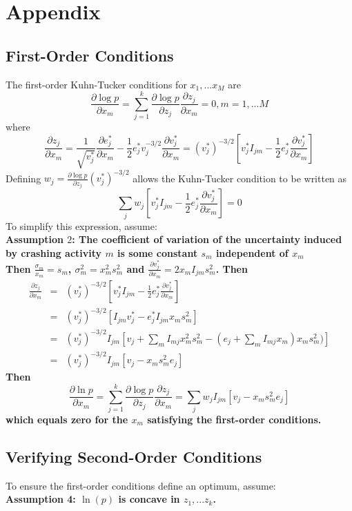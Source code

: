 \documentclass[11pt]{article}
\begin{document}
  \section{Appendix }
  \subsection{First-Order Conditions}
  The first-order Kuhn-Tucker conditions for $x_1,...x_M$ are
$$\frac{\partial \log p}{\partial x_m} = \sum_{j=1}^k \frac{\partial \log p}{\partial z_j} 
\frac{\partial z_j}{\partial x_m} =0  , m=1,...M $$
where
$$ \frac{\partial z_j}{\partial x_m} = \frac{1}{\sqrt{v^*_j}} \frac{\partial e^*_j}{\partial x_m}-  
\frac{1}{2} e^*_j v_j^{-3/2} \frac{\partial v^*_j}{\partial x_m} = (v^*_j)^{-3/2} [v^*_j I_{jm} -   \frac{1}{2} e^*_j  \frac{\partial v^*_j}{\partial x_m}]  $$
Defining $w_j =\frac{\partial \log p}{\partial z_j} (v^*_j)^{-3/2}$ allows the Kuhn-Tucker condition to be written as
$$ \sum_j w_j [v^*_j I_{jm} -   \frac{1}{2} e^*_j  \frac{\partial v^*_j}{\partial x_m}] =0 $$
To simplify this expression, assume: \\
\bf Assumption $2$: \rm The coefficient of variation of the uncertainty induced by crashing activity $m$ is some constant $s_m$ independent of $x_m$ \\ 
Then 
$\frac{\sigma_m}{x_m}=s_m$, $\sigma^2_m=x^2_m s^2_m$ and $\frac{\partial v^*_j}{\partial x_m} = 2 x_m I_{jm} s^2_m$.  
Then
\begin{eqnarray*}
 \frac{\partial z_j}{\partial x_m} &=& (v^*_j)^{-3/2} [v^*_j I_{jm} -   \frac{1}{2} e^*_j  \frac{\partial v^*_j}{\partial x_m}] \\
  &=& (v^*_j)^{-3/2} [I_{jm} v^*_j-  e^*_j I_{jm} x_m s^2_m ]
\\ &=&
(v^*_j)^{-3/2}I_{jm} [v_j +  \sum_m I_{mj} x^2_m s^2_m -  (e_j + \sum_m I_{mj} x_m)  x_m s^2_m)]  \\
&=& (v^*_j)^{-3/2} I_{jm} [v_j-x_m s^2_m e_j]  
\end{eqnarray*}
Then $$\frac{\partial \ln p}{\partial x_m} =
\sum_{j=1}^k \frac{\partial \log p}{\partial z_j} 
\frac{\partial z_j}{\partial x_m} = \sum_j w_j I_{jm} [v_j-x_m s^2_m e_j] $$
which equals zero for the $x_m$ satisfying the first-order conditions.\subsection{Verifying Second-Order Conditions} 
To ensure the first-order conditions define an optimum, assume:
\\ \bf Assumption 4: \rm  $\ln(p)$ is concave in $z_1,...z_k$. \\
\end{document}
